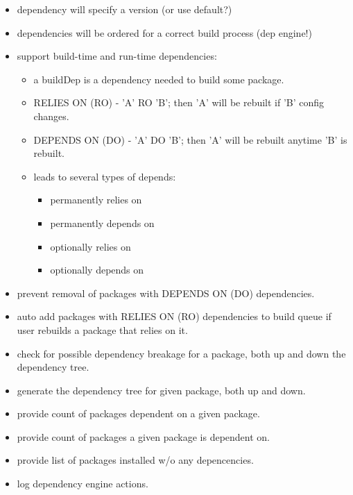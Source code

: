\documentclass[a4paper]{article}
\begin{document}
\begin{itemize}

  \item dependency will specify a version (or use default?)
  \item dependencies will be ordered for a correct build process (dep engine!)
  \item support build-time and run-time dependencies:

  \begin{itemize}
    \item a buildDep is a dependency needed to build some package.
    \item RELIES ON (RO) - 'A' RO 'B'; then 'A' will be rebuilt if 'B' config changes.
    \item DEPENDS ON (DO) - 'A' DO 'B'; then 'A' will be rebuilt anytime 'B' is rebuilt.
    \item leads to several types of depends:

    \begin{itemize}
      \item permanently relies on
      \item permanently depends on
      \item optionally relies on
      \item optionally depends on
    \end{itemize}

  \end{itemize}

  \item prevent removal of packages with DEPENDS ON (DO) dependencies.
  \item auto add packages with RELIES ON (RO) dependencies to build queue if user rebuilds a package that relies on it.
  \item check for possible dependency breakage for a package, both up and down the dependency tree.
  \item generate the dependency tree for given package, both up and down.
  \item provide count of packages dependent on a given package.
  \item provide count of packages a given package is dependent on.
  \item provide list of packages installed w/o any depencencies.
  \item log dependency engine actions.

\end{itemize}
\end{document}
